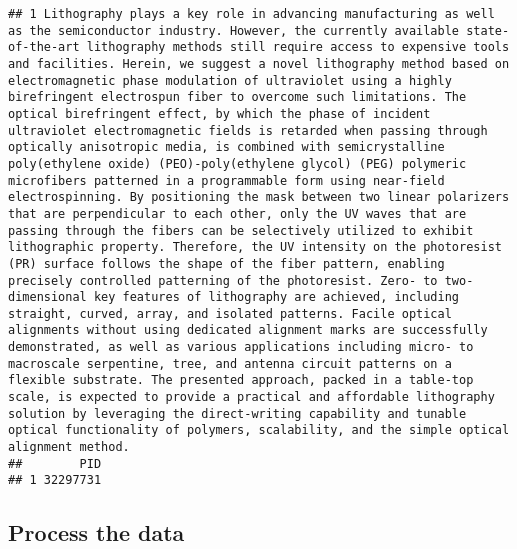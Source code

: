 \documentclass[
  a4paper]{article}
\begin{document}
\begin{verbatim}
## 1 Lithography plays a key role in advancing manufacturing as well as the semiconductor industry. However, the currently available state-of-the-art lithography methods still require access to expensive tools and facilities. Herein, we suggest a novel lithography method based on electromagnetic phase modulation of ultraviolet using a highly birefringent electrospun fiber to overcome such limitations. The optical birefringent effect, by which the phase of incident ultraviolet electromagnetic fields is retarded when passing through optically anisotropic media, is combined with semicrystalline poly(ethylene oxide) (PEO)-poly(ethylene glycol) (PEG) polymeric microfibers patterned in a programmable form using near-field electrospinning. By positioning the mask between two linear polarizers that are perpendicular to each other, only the UV waves that are passing through the fibers can be selectively utilized to exhibit lithographic property. Therefore, the UV intensity on the photoresist (PR) surface follows the shape of the fiber pattern, enabling precisely controlled patterning of the photoresist. Zero- to two-dimensional key features of lithography are achieved, including straight, curved, array, and isolated patterns. Facile optical alignments without using dedicated alignment marks are successfully demonstrated, as well as various applications including micro- to macroscale serpentine, tree, and antenna circuit patterns on a flexible substrate. The presented approach, packed in a table-top scale, is expected to provide a practical and affordable lithography solution by leveraging the direct-writing capability and tunable optical functionality of polymers, scalability, and the simple optical alignment method.
##        PID
## 1 32297731
\end{verbatim}

\hypertarget{process-the-data}{%
\subsection{Process the data}\label{process-the-data}}
\end{document}
